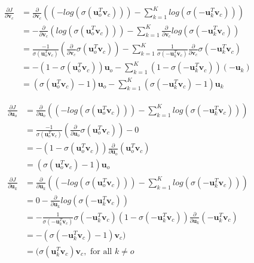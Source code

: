\documentclass[fleqn]{MJD}
\newcommand{\0}{\emptyset}
\begin{document}
\begin{align}
	\frac{\partial J}{\partial \bm{v}_{c}} &= %
		\frac{\partial}{\partial \bm{v}_{c}} ( (-log(\sigma(\bm{u}_{o}^{T} \bm{v}_{c}))) - %
			\sum\limits_{k=1}^{K} log(\sigma(- \bm{u}_{k}^{T} \bm{v}_{c})) )\nonumber \\
		&= %
		- \frac{\partial}{\partial \bm{v}_{c}} (log(\sigma(\bm{u}_{o}^{T} \bm{v}_{c}))) - %
		   \sum\limits_{k=1}^{K} \frac{\partial}{\partial \bm{v}_{c}} log(\sigma(- \bm{u}_{k}^{T} \bm{v}_{c})) \nonumber \\
		&= %
		\frac{-1}{ \sigma(\bm{u}_{o}^{T} \bm{v}_{c})} (\frac{\partial}{\partial \bm{v}_{c}} \sigma(\bm{u}_{o}^{T} \bm{v}_{c})) - %
		   \sum\limits_{k=1}^{K} \frac{1}{\sigma(- \bm{u}_{k}^{T} \bm{v}_{c})} \frac{\partial}{\partial \bm{v}_{c}} \sigma(- \bm{u}_{k}^{T} \bm{v}_{c}) \nonumber \\
		&= %
		-(1-\sigma(\bm{u}_{o}^{T} \bm{v}_{c})) \bm{u}_{o} - %
		   \sum\limits_{k=1}^{K} (1- \sigma(- \bm{u}_{k}^{T} \bm{v}_{c})) (- \bm{u}_{k}) \nonumber \\
		&= %
		(\sigma(\bm{u}_{o}^{T} \bm{v}_{c}) - 1) \bm{u}_{o} - %
		   \sum\limits_{k=1}^{K} ( \sigma(- \bm{u}_{k}^{T} \bm{v}_{c}) - 1) \bm{u}_{k} \nonumber 
\end{align}

\begin{align}
	\frac{\partial J}{\partial \bm{u}_{o}} &= %
		\frac{\partial}{\partial \bm{u}_{o}} ( (-log(\sigma(\bm{u}_{o}^{T} \bm{v}_{c}))) - %
			\sum\limits_{k=1}^{K} log(\sigma(- \bm{u}_{k}^{T} \bm{v}_{c})) )\nonumber \\
		&= %
		\frac{-1}{ \sigma(\bm{u}_{o}^{T} \bm{v}_{c})} (\frac{\partial}{\partial \bm{u}_{o}} \sigma(\bm{u}_{o}^{T} \bm{v}_{c})) - 0 \nonumber \\
		&= %
		-(1- \sigma(\bm{u}_{o}^{T} \bm{v}_{c}))\frac{\partial}{\partial \bm{u}_{o}}(\bm{u}_{o}^{T} \bm{v}_{c}) \nonumber \\
		&= (\sigma(\bm{u}_{o}^{T} \bm{v}_{c})-1)\bm{u}_{o} \nonumber \\
	\frac{\partial J}{\partial \bm{u}_{k}} &= %
		\frac{\partial}{\partial \bm{u}_{k}} ( (-log(\sigma(\bm{u}_{o}^{T} \bm{v}_{c}))) - %
			\sum\limits_{k=1}^{K} log(\sigma(- \bm{u}_{k}^{T} \bm{v}_{c})) )\nonumber \\
		&= %
		0 - \frac{\partial}{\partial \bm{u}_{k}} log(\sigma(-\bm{u}_{k}^{T} \bm{v}_{c})) \nonumber \\
		&= -\frac{1}{\sigma(-\bm{u}_{k}^{T} \bm{v}_{c})}\sigma(-\bm{u}_{k}^{T} \bm{v}_{c})(1-\sigma(-\bm{u}_{k}^{T} \bm{v}_{c})) %
			\frac{\partial}{\partial \bm{u}_{k}}(-\bm{u}_{k}^{T} \bm{v}_{c}) \nonumber \\
		&= %
		-(\sigma(-\bm{u}_{k}^{T} \bm{v}_{c}) - 1) \bm{v}_{c}) \nonumber \\
		&= (\sigma(\bm{u}_{k}^{T} \bm{v}_{c})  \bm{v}_{c} ,\mbox{  for all } k \neq o \nonumber
\end{align}
\end{document}
